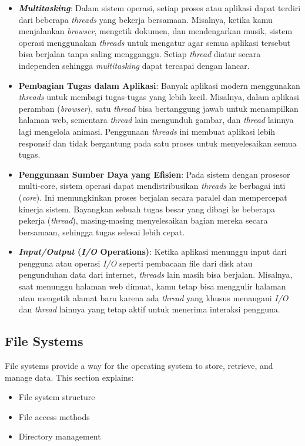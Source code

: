 \documentclass[12pt]{article}
\begin{document}
\begin{itemize}
    \item \textbf{\textit{Multitasking}}: Dalam sistem operasi, setiap proses atau aplikasi dapat terdiri dari beberapa \textit{threads} yang bekerja bersamaan. Misalnya, ketika kamu menjalankan \textit{browser}, mengetik dokumen, dan mendengarkan musik, sistem operasi menggunakan \textit{threads} untuk mengatur agar semua aplikasi tersebut bisa berjalan tanpa saling mengganggu. Setiap \textit{thread} diatur secara independen sehingga \textit{multitasking} dapat tercapai dengan lancar.
    
    \item \textbf{Pembagian Tugas dalam Aplikasi}: Banyak aplikasi modern menggunakan \textit{threads} untuk membagi tugas-tugas yang lebih kecil. Misalnya, dalam aplikasi peramban (\textit{browser}), satu \textit{thread} bisa bertanggung jawab untuk menampilkan halaman web, sementara \textit{thread} lain mengunduh gambar, dan \textit{thread} lainnya lagi mengelola animasi. Penggunaan \textit{threads} ini membuat aplikasi lebih responsif dan tidak bergantung pada satu proses untuk menyelesaikan semua tugas.
    
    \item \textbf{Penggunaan Sumber Daya yang Efisien}: Pada sistem dengan prosesor multi-core, sistem operasi dapat mendistribusikan \textit{threads} ke berbagai inti (\textit{core}). Ini memungkinkan proses berjalan secara paralel dan mempercepat kinerja sistem. Bayangkan sebuah tugas besar yang dibagi ke beberapa pekerja (\textit{thread}), masing-masing menyelesaikan bagian mereka secara bersamaan, sehingga tugas selesai lebih cepat.
    
    \item \textbf{\textit{Input/Output} (\textit{I/O} Operations)}: Ketika aplikasi menunggu input dari pengguna atau operasi \textit{I/O} seperti pembacaan file dari disk atau pengunduhan data dari internet, \textit{threads} lain masih bisa berjalan. Misalnya, saat menunggu halaman web dimuat, kamu tetap bisa menggulir halaman atau mengetik alamat baru karena ada \textit{thread} yang khusus menangani \textit{I/O} dan \textit{thread} lainnya yang tetap aktif untuk menerima interaksi pengguna.
\end{itemize}




\subsection{File Systems}
File systems provide a way for the operating system to store, retrieve, and manage data. This section explains:
\begin{itemize}
    \item File system structure
    \item File access methods
    \item Directory management
\end{itemize}
\end{document}
